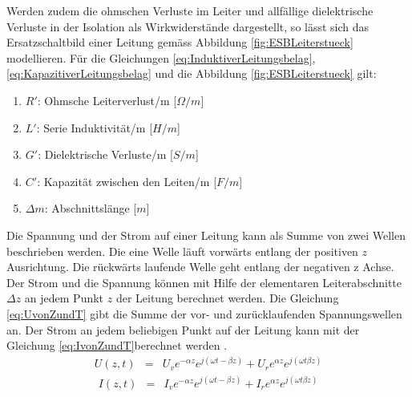 Werden zudem die ohmschen Verluste im Leiter und allfällige dielektrische Verluste in der Isolation als Wirkwiderstände dargestellt, so lässt sich das Ersatzschaltbild einer Leitung gemäss Abbildung \ref{fig:ESBLeiterstueck} modellieren.
Für die Gleichungen \ref{eq:InduktiverLeitungsbelag}, \ref{eq:KapazitiverLeitungsbelag} und die Abbildung \ref{fig:ESBLeiterstueck} gilt:
\begin{enumerate}[leftmargin=2cm]
   \item[] $R'$: Ohmsche Leiterverlust/m [$\Omega/m$] 
   \item[] $L'$: Serie Induktivität/m  [$H/m$] 
   \item[] $G'$: Dielektrische Verluste/m  [$S/m$] 
   \item[] $C'$: Kapazität zwischen den Leiten/m  [$F/m$] 
   \item[] $\Delta m$: Abschnittslänge  [$m$] 
\end{enumerate} 
Die Spannung und der Strom auf einer Leitung kann als Summe von zwei Wellen beschrieben werden. Die eine Welle läuft vorwärts entlang der positiven $z$ Ausrichtung. Die rückwärts laufende Welle geht entlang der negativen z Achse. Der Strom und die Spannung können mit Hilfe der elementaren Leiterabschnitte $\Delta z$ an jedem Punkt $z$  der Leitung berechnet werden. Die Gleichung \ref{eq:UvonZundT} gibt die Summe der vor- und zurücklaufenden Spannungswellen an. Der Strom an jedem beliebigen Punkt auf der Leitung kann mit der Gleichung \ref{eq:IvonZundT}berechnet werden \cite{Tekom}.
\begin{eqnarray}\label{eq:UvonZundT}
U(z,t) &=& U_{v}e^{-\alpha z}e^{j(\omega t -\beta z)}+U_{r}e^{\alpha z}e^{j(\omega t \beta z)}
\end{eqnarray}
\begin{eqnarray}\label{eq:IvonZundT}
I(z,t) &=& I_{v}e^{-\alpha z}e^{j(\omega t -\beta z)}+I_{r}e^{\alpha z}e^{j(\omega t \beta z)}
\end{eqnarray}

